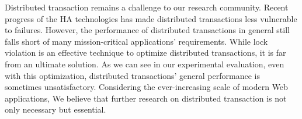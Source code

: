\documentclass[conference]{IEEEtran}
\begin{document}
Distributed transaction remains a challenge to our research community. Recent progress of the HA technologies has made distributed transactions less vulnerable to failures.
However, the performance of distributed transactions in general still falls short of many mission-critical applications' requirements.
While lock violation is an effective technique to optimize distributed transactions, it is far from an ultimate solution.
As we can see in our experimental evaluation, even with this optimization, distributed transactions' general performance is sometimes unsatisfactory.
Considering the ever-increasing scale of modern Web applications, We believe that further research on distributed transaction is not only necessary but essential.




 
\end{document}
